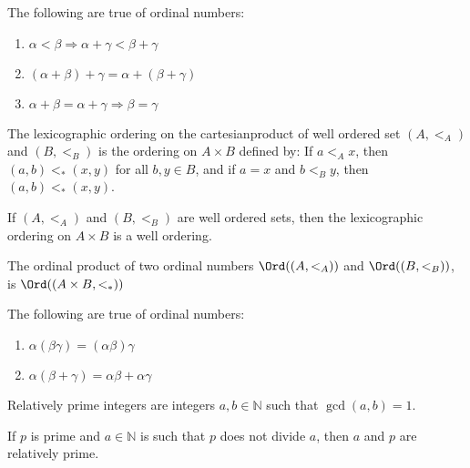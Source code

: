         \begin{theorem}
           The following are true of ordinal numbers:
           \begin{enumerate}
                \item $\alpha<\beta\Rightarrow\alpha+\gamma<\beta+\gamma$
                \item $(\alpha+\beta)+\gamma=\alpha+(\beta+\gamma)$
                \item $\alpha+\beta=\alpha+\gamma\Rightarrow\beta=\gamma$
           \end{enumerate}
        \end{theorem}
        \begin{definition}
            The lexicographic ordering on the cartesianproduct of well
            ordered set $(A,<_{A})$ and $(B,<_{B})$ is the ordering on
            ${A}\times{B}$ defined by: If ${a}<_{A}{x}$, then
            $(a,b)<_{*}(x,y)$ for all $b,y\in{B}$, and if $a=x$ and
            $b<_{B}y$, then $(a,b)<_{*}(x,y)$.
        \end{definition}
        \begin{theorem}
            If $(A,<_{A})$ and $(B,<_{B})$ are well ordered sets, then the
            lexicographic ordering on ${A}\times{B}$ is a well ordering.
        \end{theorem}
        \begin{definition}
            The ordinal product of two ordinal numbers
            $\Ord((A,<_{A}))$ and $\Ord((B,<_{B}))$,
            is $\Ord(({A}\times{B},<_{*}))$
        \end{definition}
        \begin{theorem}
            The following are true of ordinal numbers:
            \begin{enumerate}
                \item $\alpha(\beta\gamma)=(\alpha\beta)\gamma$
                \item $\alpha(\beta+\gamma)=\alpha\beta+\alpha\gamma$
            \end{enumerate}
        \end{theorem}
        \begin{definition}
           Relatively prime integers are integers
           $a,b\in\mathbb{N}$ such that $\gcd(a,b)=1$.
        \end{definition}
        \begin{theorem}
           If $p$ is prime and $a\in\mathbb{N}$ is
           such that $p$ does not divide $a$, then $a$ and $p$
           are relatively prime.
        \end{theorem}

